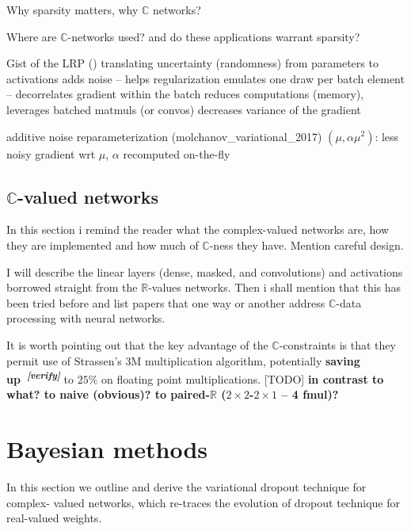 \documentclass[a4paper,10pt]{article}
\newcommand{\real}{\mathbb{R}}
\newcommand{\cplx}{\mathbb{C}}
\newcommand{\important}[1]{\textbf{\color{red} #1}}
\newcommand{\attn}[2]{\textbf{\color{red} #2~\textsuperscript{\textit{[#1]}}}}
\newcommand{\verify}[1]{\attn{verify}{#1}}
\newcommand{\todo}[1]{{\color{blue} [TODO]} \important{#1}}
\begin{document}
Why sparsity matters, why $\cplx$ networks?

Where are $\cplx$-networks used? and do these applications warrant sparsity?

Gist of the LRP (\cite{kingma_variational_2015})
translating uncertainty (randomness) from parameters to activations
  adds noise -- helps regularization
  emulates one draw per batch element -- decorrelates gradient within the batch
  reduces computations (memory), leverages batched matmuls (or convos)
  decreases variance of the gradient

additive noise reparameterization (molchanov\_variational\_2017) $(\mu, \alpha \mu^2)$:
  less noisy gradient wrt $\mu$, $\alpha$ recomputed on-the-fly

\subsection{$\cplx$-valued networks} %
\label{sub:c_valued_networks}

In this section i remind the reader what the complex-valued networks are, how
they are implemented and how much of $\cplx$-ness they have. Mention careful
design.

I will describe the linear layers (dense, masked, and convolutions) and
activations borrowed straight from the $\real$-values networks. Then i shall
mention that this has been tried before and list papers that one way or another
address $\cplx$-data processing with neural networks.


It is worth pointing out that the key advantage of
the $\cplx$-constraints is that they permit use of Strassen's $3$M multiplication algorithm,
potentially \verify{saving up} to $25\%$ on floating point multiplications. \todo{
  in contrast to what? to na{\:i}ve (obvious)? to paired-$\real$ ($2 \times 2$-$2\times 1$
  -- 4 fmul)?
}


\section{Bayesian methods} %
\label{sec:bayesian_methods}

In this section we outline and derive the variational dropout technique for complex-%
valued networks, which re-traces the evolution of dropout technique for real-valued
weights.
\end{document}
